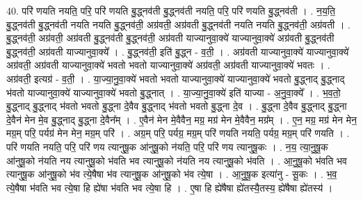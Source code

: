 \documentclass[17pt]{extarticle}
\begin{document}
40. परि॑ णयति नयति॒ परि॒ परि॑ णयति बु॒द्ध्नव॑ती बु॒द्ध्नव॑ती नयति॒ परि॒ परि॑ णयति बु॒द्ध्नव॑ती । . न॒य॒ति॒ बु॒द्ध्नव॑ती बु॒द्ध्नव॑ती नयति नयति बु॒द्ध्नव॑ती॒ अग्र॑वती॒ अग्र॑वती बु॒द्ध्नव॑ती नयति नयति बु॒द्ध्नव॑ती॒ अग्र॑वती । . बु॒द्ध्नव॑ती॒ अग्र॑वती॒ अग्र॑वती बु॒द्ध्नव॑ती बु॒द्ध्नव॑ती॒ अग्र॑वती याज्यानुवा॒क्ये॑ याज्यानुवा॒क्ये॑ अग्र॑वती बु॒द्ध्नव॑ती बु॒द्ध्नव॑ती॒ अग्र॑वती याज्यानुवा॒क्ये᳚ । . बु॒द्ध्नव॑ती॒ इति॑ बु॒द्ध्न - व॒ती॒ । . अग्र॑वती याज्यानुवा॒क्ये॑ याज्यानुवा॒क्ये॑ अग्र॑वती॒ अग्र॑वती याज्यानुवा॒क्ये॑ भवतो भवतो याज्यानुवा॒क्ये॑ अग्र॑वती॒ अग्र॑वती याज्यानुवा॒क्ये॑ भवतः । . अग्र॑वती॒ इत्यग्र॑ - व॒ती॒ । . या॒ज्या॒नु॒वा॒क्ये॑ भवतो भवतो याज्यानुवा॒क्ये॑ याज्यानुवा॒क्ये॑ भवतो बु॒द्ध्नाद् बु॒द्ध्नाद् भ॑वतो याज्यानुवा॒क्ये॑ याज्यानुवा॒क्ये॑ भवतो बु॒द्ध्नात् । . या॒ज्या॒नु॒वा॒क्ये॑ इति॑ याज्या - अ॒नु॒वा॒क्ये᳚ । . भ॒व॒तो॒ बु॒द्ध्नाद् बु॒द्ध्नाद् भ॑वतो भवतो बु॒द्ध्ना दे॒वैव बु॒द्ध्नाद् भ॑वतो भवतो बु॒द्ध्ना दे॒व । . बु॒द्ध्ना दे॒वैव बु॒द्ध्नाद् बु॒द्ध्ना दे॒वैन॑ मेन मे॒व बु॒द्ध्नाद् बु॒द्ध्ना दे॒वैन᳚म् । . ए॒वैन॑ मेन मे॒वैवैन॒ मग्र॒ मग्र॑ मेन मे॒वैवैन॒ मग्र᳚म् । . ए॒न॒ मग्र॒ मग्र॑ मेन मेन॒ मग्र॒म् परि॒ पर्यग्र॑ मेन मेन॒ मग्र॒म् परि॑ । . अग्र॒म् परि॒ पर्यग्र॒ मग्र॒म् परि॑ णयति नयति॒ पर्यग्र॒ मग्र॒म् परि॑ णयति । . परि॑ णयति नयति॒ परि॒ परि॑ णय त्यानुषू॒क आ॑नुषू॒को न॑यति॒ परि॒ परि॑ णय त्यानुषू॒कः । . न॒य॒ त्या॒नु॒षू॒क आ॑नुषू॒को न॑यति नय त्यानुषू॒को भ॑वति भव त्यानुषू॒को न॑यति नय त्यानुषू॒को भ॑वति । . आ॒नु॒षू॒को भ॑वति भव त्यानुषू॒क आ॑नुषू॒को भ॑व त्ये॒षैषा भ॑व त्यानुषू॒क आ॑नुषू॒को भ॑व त्ये॒षा । . आ॒नु॒षू॒क इत्या॑नु - सू॒कः । . भ॒व॒ त्ये॒षैषा भ॑वति भव त्ये॒षा हि ह्ये॑षा भ॑वति भव त्ये॒षा हि । . ए॒षा हि ह्ये॑षैषा ह्ये॑तस्यै॒तस्य॒ ह्ये॑षैषा ह्ये॑तस्य॑ । \newline
\end{document}
